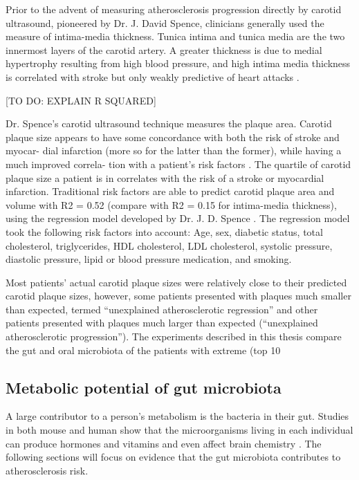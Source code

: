 Prior to the advent of measuring atherosclerosis progression directly by carotid ultrasound, pioneered by Dr. J. David Spence, clinicians generally used the measure of intima-media thickness. Tunica intima and tunica media are the two innermost layers of the carotid artery. A greater thickness is due to medial hypertrophy resulting from high blood pressure, and high intima media thickness is correlated with stroke but only weakly predictive of heart attacks \cite{spence2006technology}.

[TO DO: EXPLAIN R SQUARED]

Dr. Spence’s carotid ultrasound technique measures the plaque area. Carotid plaque size appears to have some concordance with both the risk of stroke and myocar-
dial infarction (more so for the latter than the former), while having a much improved correla-
tion with a patient’s risk factors \cite{spence2006technology}. The quartile of carotid plaque size a patient is in correlates with the risk of a stroke or myocardial infarction. Traditional risk factors are able to predict carotid plaque area and volume with R2 = 0.52 (compare with R2 = 0.15 for intima-media thickness), using the regression model developed by Dr. J. D. Spence \cite{spence2012genetics}. The regression model took the following risk factors into account: Age, sex, diabetic status, total cholesterol, triglycerides, HDL cholesterol, LDL cholesterol, systolic pressure, diastolic pressure, lipid or blood pressure medication, and smoking.

Most patients’ actual carotid plaque sizes were relatively close to their predicted carotid plaque sizes, however, some patients presented with plaques much smaller than expected, termed “unexplained atherosclerotic regression” and other patients presented with plaques much larger than expected (“unexplained atherosclerotic progression”). The experiments described in this thesis compare the gut and oral microbiota of the patients with extreme (top 10%

\FloatBarrier

\subsection{Metabolic potential of gut microbiota}
A large contributor to a person’s metabolism is the bacteria in their gut. Studies in both mouse and human show that the microorganisms living in each individual \cite{guarner2003gut} can produce hormones \cite{sperandio2003bacteria} and vitamins \cite{burkholder1942synthesis} and even affect brain chemistry \cite{collins2013adoptive}. The following sections will focus on evidence that the gut microbiota contributes to atherosclerosis risk.

